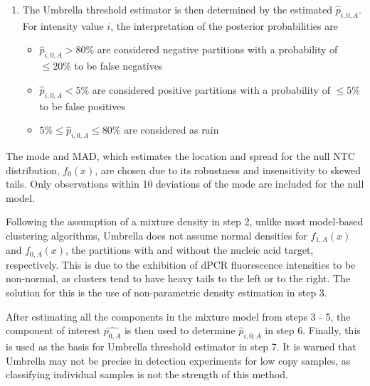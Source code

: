 \begin{enumerate}
    \item The Umbrella threshold estimator is then determined by the estimated \(\hat{p}_{i,0,A}\). For intensity value \(i\), the interpretation of the posterior probabilities are 
    \begin{itemize}
        \item \(\hat{p}_{i,0,A} > 80\%\) are considered negative partitions with a probability of \(\leq20\%\) to be false negatives
        \item \(\hat{p}_{i,0,A} < 5\%\) are considered positive partitions with a probability of \(\leq5\%\) to be false positives
        \item \(5\% \leq \hat{p}_{i,0,A} \leq 80\%\) are considered as rain
    \end{itemize}
\end{enumerate}

The mode and MAD, which estimates the location and spread for the null NTC distribution, \(f_{0}(x)\), are chosen due to its robustness and insensitivity to skewed tails. Only observations within 10 deviations of the mode are included for the null model.

Following the assumption of a mixture density in step 2, unlike most model-based clustering algorithms, Umbrella does not assume normal densities for \(f_{1,A}(x)\) and \(f_{0,A}(x)\), the partitions with and without the nucleic acid target, respectively. This is due to the exhibition of dPCR fluorescence intensities to be non-normal, as clusters tend to have heavy tails to the left or to the right. The solution for this is the use of non-parametric density estimation in step 3.

After estimating all the components in the mixture model from steps 3 - 5, the component of interest \(\hat{p_{0,A}}\) is then used to determine \(\hat{p}_{i,0,A}\) in step 6. Finally, this is used as the basis for Umbrella threshold estimator in step 7. It is warned that Umbrella may not be precise in detection experiments for low copy samples, as classifying individual samples is not the strength of this method.

